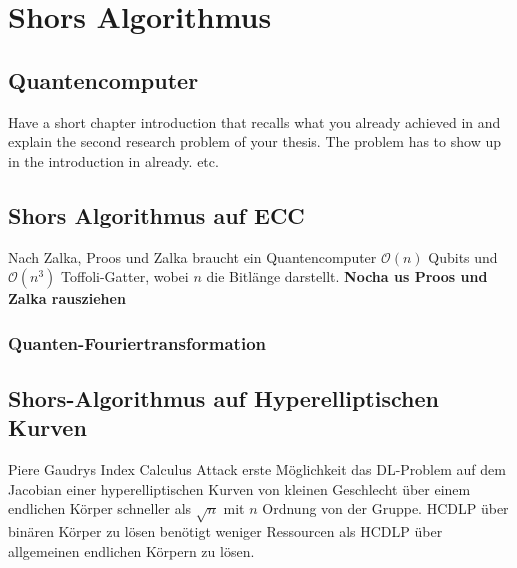 \chapter{Shors Algorithmus}
\section{Quantencomputer}

Have a short chapter introduction that recalls what you already achieved in  and explain the second research problem of your thesis.
The problem has to show up in the introduction in  already.
etc.
\section{Shors Algorithmus auf ECC}
Nach Zalka, Proos und Zalka braucht ein Quantencomputer $\mathcal{O}(n)$ Qubits und $\mathcal{O}(n^3)$ Toffoli-Gatter, wobei $n$ die Bitlänge darstellt.\cite[S.2]{Huang25} \textbf{Nocha us Proos und Zalka rausziehen}
\subsection{Quanten-Fouriertransformation}
\section{Shors-Algorithmus auf Hyperelliptischen Kurven}
Piere Gaudrys Index Calculus Attack erste Möglichkeit das DL-Problem auf dem Jacobian einer hyperelliptischen Kurven von kleinen Geschlecht über einem endlichen Körper schneller als $\sqrt{n}$ mit $n$ Ordnung von der Gruppe. \cite[S.75]{Theriault03}
HCDLP über binären Körper zu lösen benötigt weniger Ressourcen als HCDLP über allgemeinen endlichen Körpern zu lösen.\cite[S.1]{Huang25}
